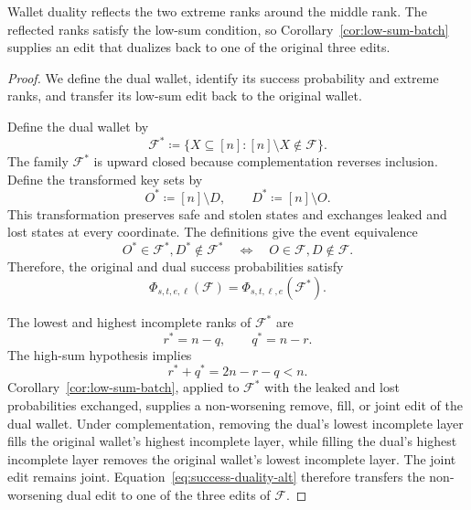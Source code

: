 \documentclass[11pt]{article}
\newcommand{\cF}{\ensuremath{\mathcal F}\xspace}
\begin{document}
Wallet duality reflects the two extreme ranks around the middle rank.
The reflected ranks satisfy the low-sum condition, so Corollary~\ref{cor:low-sum-batch} supplies an edit that dualizes back to one of the original three edits.

\begin{proof}
We define the dual wallet, identify its success probability and extreme ranks, and transfer its low-sum edit back to the original wallet.

Define the dual wallet by
\begin{equation*}
\cF^\ast
\coloneqq
\{X\subseteq[n]:[n]\setminus X\notin\cF\}.
\end{equation*}
The family $\cF^\ast$ is upward closed because complementation reverses inclusion.
Define the transformed key sets by
\begin{equation*}
O^\ast\coloneqq[n]\setminus D,
\qquad
D^\ast\coloneqq[n]\setminus O.
\end{equation*}
This transformation preserves safe and stolen states and exchanges leaked and lost states at every coordinate.
The definitions give the event equivalence
\begin{equation*}
O^\ast\in\cF^\ast, D^\ast\notin\cF^\ast
\quad\Longleftrightarrow\quad
O\in\cF, D\notin\cF.
\end{equation*}
Therefore, the original and dual success probabilities satisfy
\begin{equation}
\Phi_{s,t,e,\ell}(\cF)
=
\Phi_{s,t,\ell,e}(\cF^\ast).
\label{eq:success-duality-alt}
\end{equation}

The lowest and highest incomplete ranks of $\cF^\ast$ are
\begin{equation*}
r^\ast=n-q,
\qquad
q^\ast=n-r.
\end{equation*}
The high-sum hypothesis implies
\begin{equation*}
r^\ast+q^\ast=2n-r-q<n.
\end{equation*}
Corollary~\ref{cor:low-sum-batch}, applied to $\cF^\ast$ with the leaked and lost probabilities exchanged, supplies a non-worsening remove, fill, or joint edit of the dual wallet.
Under complementation, removing the dual's lowest incomplete layer fills the original wallet's highest incomplete layer, while filling the dual's highest incomplete layer removes the original wallet's lowest incomplete layer.
The joint edit remains joint.
Equation~\eqref{eq:success-duality-alt} therefore transfers the non-worsening dual edit to one of the three edits of $\cF$.
\end{proof}
\end{document}
